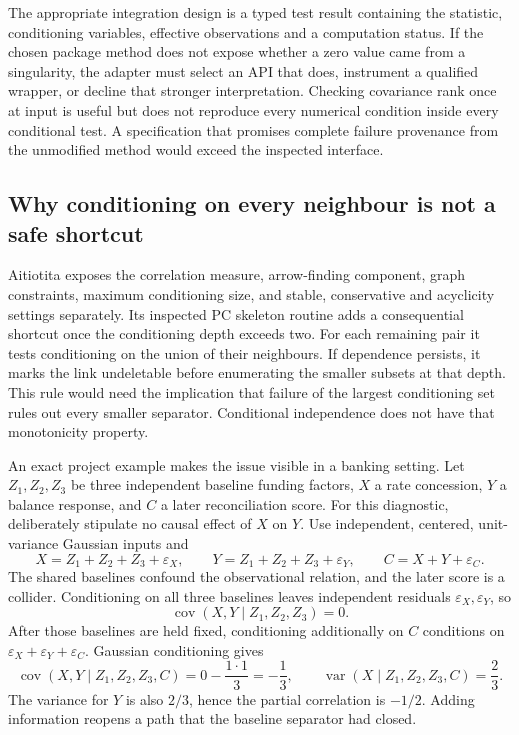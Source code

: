 The appropriate integration design is a typed test result containing the
statistic, conditioning variables, effective observations and a
computation status. If the chosen package method does not expose whether
a zero value came from a singularity, the adapter must select an API
that does, instrument a qualified wrapper, or decline that stronger
interpretation. Checking covariance rank once at input is useful but
does not reproduce every numerical condition inside every conditional
test. A specification that promises complete failure provenance from the
unmodified method would exceed the inspected interface.

\hypertarget{why-conditioning-on-every-neighbour-is-not-a-safe-shortcut}{%
\subsection{Why conditioning on every neighbour is not a safe
shortcut}\label{why-conditioning-on-every-neighbour-is-not-a-safe-shortcut}}

Aitiotita exposes the correlation measure, arrow-finding component,
graph constraints, maximum conditioning size, and stable, conservative
and acyclicity settings separately. Its inspected PC skeleton routine
adds a consequential shortcut once the conditioning depth exceeds two.
For each remaining pair it tests conditioning on the union of their
neighbours. If dependence persists, it marks the link undeletable before
enumerating the smaller subsets at that depth. This rule would need the
implication that failure of the largest conditioning set rules out every
smaller separator. Conditional independence does not have that
monotonicity property. \citep{exec13_java_aitiotita}

An exact project example makes the issue visible in a banking setting.
Let \(Z_1,Z_2,Z_3\) be three independent baseline funding factors, \(X\)
a rate concession, \(Y\) a balance response, and \(C\) a later
reconciliation score. For this diagnostic, deliberately stipulate no
causal effect of \(X\) on \(Y\). Use independent, centered,
unit-variance Gaussian inputs and \[
 X=Z_1+Z_2+Z_3+\varepsilon_X,\qquad
 Y=Z_1+Z_2+Z_3+\varepsilon_Y,\qquad
 C=X+Y+\varepsilon_C.
\] The shared baselines confound the observational relation, and the
later score is a collider. Conditioning on all three baselines leaves
independent residuals \(\varepsilon_X,\varepsilon_Y\), so \[
 \operatorname{cov}(X,Y\mid Z_1,Z_2,Z_3)=0.
\] After those baselines are held fixed, conditioning additionally on
\(C\) conditions on \(\varepsilon_X+\varepsilon_Y+\varepsilon_C\).
Gaussian conditioning gives \[
 \operatorname{cov}(X,Y\mid Z_1,Z_2,Z_3,C)
   =0-\frac{1\cdot1}{3}=-\frac13,
 \qquad
 \operatorname{var}(X\mid Z_1,Z_2,Z_3,C)=\frac23.
\] The variance for \(Y\) is also \(2/3\), hence the partial correlation
is \(-1/2\). Adding information reopens a path that the baseline
separator had closed. \citep{exec13_java_examples}

